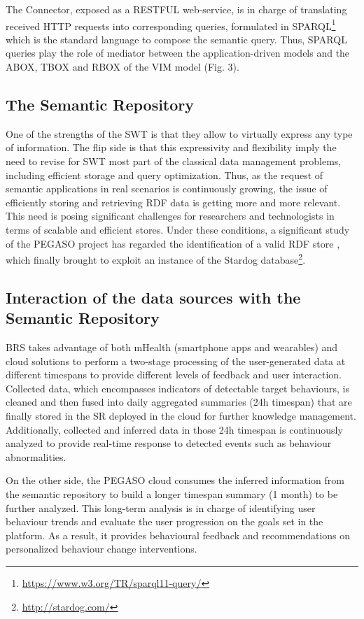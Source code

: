 \documentclass[runningheads,a4paper]{llncs}
\begin{document}
The Connector, exposed as a RESTFUL web-service, is in charge of translating received HTTP requests into corresponding queries, formulated in SPARQL\footnote{\url{https://www.w3.org/TR/sparql11-query/}} which is the standard language to compose the semantic query. Thus, SPARQL queries play the role of mediator between the application-driven models and the ABOX, TBOX and RBOX of the VIM model (Fig. 3).  

\subsection{The Semantic Repository}

One of the strengths of the SWT is that they allow to virtually express any type of information. The flip side is that this expressivity and flexibility imply the need to revise for SWT most part of the classical data management problems, including efficient storage and query optimization. Thus, as the request of semantic applications in real scenarios is continuously growing, the issue of efficiently storing and retrieving RDF data is getting more and more relevant. This need is posing significant challenges for researchers and technologists in terms of scalable and efficient stores. Under these conditions, a significant study of the PEGASO project has regarded the identification of a valid RDF store  \cite{_Ref490721446}, which finally brought to exploit an instance of the Stardog database\footnote{\url{http://stardog.com/}}.

\subsection{Interaction of the data sources with the Semantic Repository}

BRS takes advantage of both mHealth (smartphone apps and wearables) and cloud solutions to perform a two-stage processing of the user-generated data at different timespans to provide different levels of feedback and user interaction. Collected data, which encompasses indicators of detectable target behaviours, is cleaned and then fused into daily aggregated summaries (24h timespan) that are finally stored in the SR deployed in the cloud for further knowledge management. Additionally, collected and inferred data in those 24h timespan is continuously analyzed to provide real-time response to detected events such as behaviour abnormalities.

On the other side, the PEGASO cloud consumes the inferred information from the semantic repository to build a longer timespan summary (1 month) to be further analyzed. This long-term analysis is in charge of identifying user behaviour trends and evaluate the user progression on the goals set in the platform. As a result, it provides behavioural feedback and recommendations on personalized behaviour change interventions.
\end{document}
